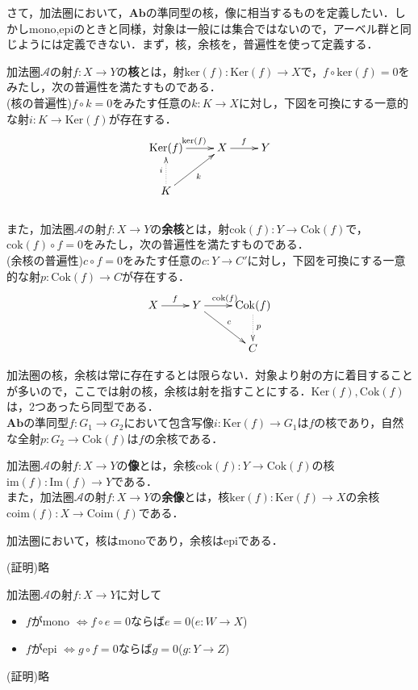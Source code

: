 さて，加法圏において，$\mathbf{Ab}$の準同型の核，像に相当するものを定義したい．しかしmono,epiのときと同様，対象は一般には集合ではないので，アーベル群と同じようには定義できない．まず，核，余核を，普遍性を使って定義する．

\begin{defi}
加法圏$\mathcal{A}$の射$f:X \to Y$の{\bf 核}とは，射$\mathrm{ker}(f): \mathrm{Ker}(f) \to X$で，$f \circ \mathrm{ker}(f) = 0$をみたし，次の普遍性を満たすものである． \\
{\rm(核の普遍性)}\;$f \circ k = 0$をみたす任意の$k:K \to X$に対し，下図を可換にする一意的な射$i:K \to \mathrm{Ker}(f)$が存在する．
\[
\xymatrix{
\mathrm{Ker}(f) \ar[r]^{\mathrm{ker}(f)} & X \ar[r]^f &Y  \\
K \ar[ur]_{k}  \ar@{.>}[u]^i
}
\]\\

また，加法圏$\mathcal{A}$の射$f:X \to Y$の{\bf 余核}とは，射$\mathrm{cok}(f): Y \to \mathrm{Cok}(f)$で，$\mathrm{cok}(f) \circ f = 0$をみたし，次の普遍性を満たすものである． \\
{\rm(余核の普遍性)}\;$c \circ f = 0$をみたす任意の$c:Y \to C'$に対し，下図を可換にする一意的な射$p:\mathrm{Cok}(f) \to C$が存在する．
\[
\xymatrix{
X \ar[r]^f 	& Y \ar[r]^{\mathrm{cok}(f)} &\mathrm{Cok}(f) \ar@{.>}[d]^p \\
&&C \ar@{<-}[ul]_{c}  
}
\]
\end{defi} \proofend
加法圏の核，余核は常に存在するとは限らない．対象より射の方に着目することが多いので，ここでは射の核，余核は射を指すことにする．$\mathrm{Ker}(f), \mathrm{Cok}(f)$は，2つあったら同型である．\\
$\mathbf{Ab}$の準同型$f:G_1 \to G_2$において包含写像$i:\mathrm{Ker}(f) \to G_1$は$f$の核であり，自然な全射$p:G_2 \to \mathrm{Cok}(f)$は$f$の余核である．

\begin{defi}
加法圏$\mathcal{A}$の射$f:X \to Y$の{\bf 像}とは，余核$\mathrm{cok}(f): Y \to \mathrm{Cok}(f)$の核$\mathrm{im}(f): \mathrm{Im}(f) \to Y$である．\\
また，加法圏$\mathcal{A}$の射$f:X \to Y$の{\bf 余像}とは，核$\mathrm{ker}(f): \mathrm{Ker}(f) \to X$の余核$\mathrm{coim}(f): X \to \mathrm{Coim}(f) $である．
\end{defi} \proofend
\begin{prop}
加法圏において，核はmonoであり，余核はepiである．
\end{prop}
(証明)\;略\proofend
\begin{prop}
加法圏$\mathcal{A}$の射$f:X \to Y$に対して
\begin{itemize}
\item $f$がmono $\Leftrightarrow f\circ e = 0$ならば$e=0$\;($e:W \to X$)
\item $f$がepi \;\;\;\;$\Leftrightarrow g\circ f = 0$ならば$g=0$\;($g:Y \to Z$)
\end{itemize}
\end{prop}
(証明)\;略\proofend

